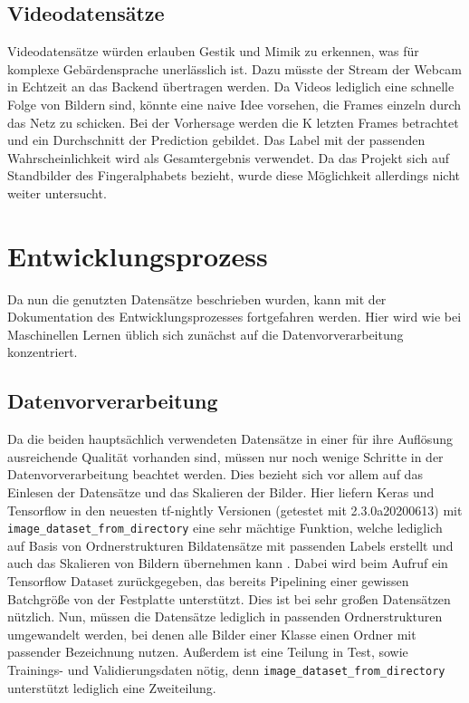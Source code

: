\documentclass[11pt,bibliography=totocnumbered]{scrartcl}
\begin{document}
\subsection{Videodatensätze}
Videodatensätze würden erlauben Gestik und Mimik zu erkennen, was für komplexe Gebärdensprache unerlässlich ist. Dazu müsste der Stream der Webcam in Echtzeit an das Backend übertragen werden. Da Videos lediglich eine schnelle Folge von Bildern sind, könnte eine naive Idee vorsehen, die Frames einzeln durch das Netz zu schicken. Bei der Vorhersage werden die K letzten Frames betrachtet und ein Durchschnitt der Prediction gebildet. Das Label mit der passenden Wahrscheinlichkeit wird als Gesamtergebnis verwendet. Da das Projekt sich auf Standbilder des Fingeralphabets bezieht, wurde diese Möglichkeit allerdings nicht weiter untersucht.
\section{Entwicklungsprozess}
Da nun die genutzten Datensätze beschrieben wurden, kann mit der Dokumentation des Entwicklungsprozesses fortgefahren werden. Hier wird wie bei Maschinellen Lernen üblich sich zunächst auf die Datenvorverarbeitung konzentriert.
\subsection{Datenvorverarbeitung}
Da die beiden hauptsächlich verwendeten Datensätze in einer für ihre Auflösung ausreichende Qualität vorhanden sind, müssen nur noch wenige Schritte in der Datenvorverarbeitung beachtet werden. Dies bezieht sich vor allem auf das Einlesen der Datensätze und das Skalieren der Bilder. Hier liefern Keras und Tensorflow in den neuesten tf-nightly Versionen (getestet mit 2.3.0a20200613) mit \lstinline[language=pythoninline]|image_dataset_from_directory| eine sehr mächtige Funktion, welche lediglich auf Basis von Ordnerstrukturen Bildatensätze mit passenden Labels erstellt und auch das Skalieren von Bildern übernehmen kann \cite{KERAS_IMAGE_PREPROCESSING}. Dabei wird beim Aufruf ein Tensorflow Dataset zurückgegeben, das bereits Pipelining einer gewissen Batchgröße von der Festplatte unterstützt. Dies ist bei sehr großen Datensätzen nützlich. Nun, müssen die Datensätze lediglich in passenden Ordnerstrukturen umgewandelt werden, bei denen alle Bilder einer Klasse einen Ordner mit passender Bezeichnung nutzen. Außerdem ist eine Teilung in Test, sowie Trainings- und Validierungsdaten nötig, denn \lstinline[language=pythoninline]|image_dataset_from_directory| unterstützt lediglich eine Zweiteilung. 
\end{document}
